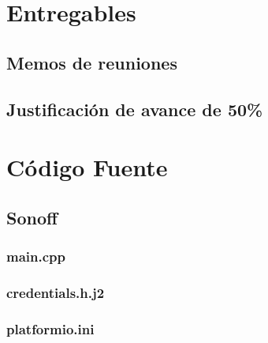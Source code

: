 \chapter{Entregables}

\section{Memos de reuniones}









\section{Justificación de avance de 50\%}





\chapter{Código Fuente} \label{anexo-codigo-fuente}


\section{Sonoff} \label{anexo-sonoff}

\subsection{main.cpp} \label{anexo-esp-main}



\subsection{credentials.h.j2} \label{anexo-credentials}



\subsection{platformio.ini}

